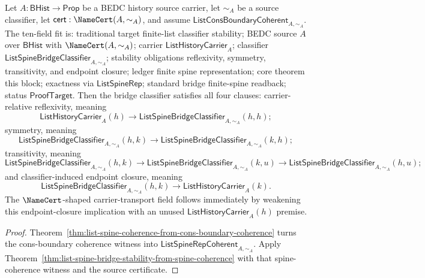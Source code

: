 \begin{theorem}
\label{thm:list-spine-bridge-stability-from-cons-boundary-coherence}
Let $A:\mathsf{BHist}\to\mathsf{Prop}$ be a BEDC history source carrier, let
$\sim_A$ be a source classifier, let $\mathsf{cert}:\NameCert(A,\sim_A)$, and
assume $\mathsf{ListConsBoundaryCoherent}_{A,\sim_A}$. The ten-field fit is:
traditional target finite-list classifier stability; BEDC source $A$ over
$\mathsf{BHist}$ with $\NameCert(A,\sim_A)$; carrier
$\mathsf{ListHistoryCarrier}_A$; classifier
$\mathsf{ListSpineBridgeClassifier}_{A,\sim_A}$; stability obligations
reflexivity, symmetry, transitivity, and endpoint closure; ledger finite spine
representation; core theorem this block; exactness via
$\mathsf{ListSpineRep}$; standard bridge finite-spine readback; status
$\mathsf{ProofTarget}$. Then the bridge classifier satisfies all four clauses:
carrier-relative reflexivity, meaning
$$
\mathsf{ListHistoryCarrier}_A(h)\to
\mathsf{ListSpineBridgeClassifier}_{A,\sim_A}(h,h);
$$
symmetry, meaning
$$
\mathsf{ListSpineBridgeClassifier}_{A,\sim_A}(h,k)\to
\mathsf{ListSpineBridgeClassifier}_{A,\sim_A}(k,h);
$$
transitivity, meaning
$$
\mathsf{ListSpineBridgeClassifier}_{A,\sim_A}(h,k)\to
\mathsf{ListSpineBridgeClassifier}_{A,\sim_A}(k,u)\to
\mathsf{ListSpineBridgeClassifier}_{A,\sim_A}(h,u);
$$
and classifier-induced endpoint closure, meaning
$$
\mathsf{ListSpineBridgeClassifier}_{A,\sim_A}(h,k)\to
\mathsf{ListHistoryCarrier}_A(k).
$$
The $\NameCert$-shaped carrier-transport field follows immediately by weakening
this endpoint-closure implication with an unused
$\mathsf{ListHistoryCarrier}_A(h)$ premise.
\end{theorem}
\begin{proof}
Theorem~\ref{thm:list-spine-coherence-from-cons-boundary-coherence} turns the
cons-boundary coherence witness into
$\mathsf{ListSpineRepCoherent}_{A,\sim_A}$. Apply
Theorem~\ref{thm:list-spine-bridge-stability-from-spine-coherence} with that
spine-coherence witness and the source certificate.
\end{proof}
